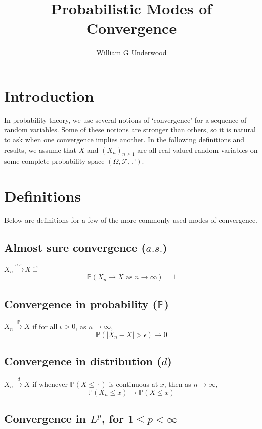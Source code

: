 \documentclass{article}
\title{Probabilistic Modes of Convergence}
\author{William G Underwood}
\begin{document}
\maketitle

\section{Introduction}

In probability theory, we use several notions of `convergence' for
a sequence of random variables.
Some of these notions are stronger than others, so it is natural to ask
when one convergence implies another.
In the following definitions and results, we assume that $X$ and $(X_n)_{n \geq 1}$ are all
real-valued random variables on some complete probability space
$(\Omega, \mathcal{F}, \mathbb{P})$.


\section{Definitions}

Below are definitions for a few of the more
commonly-used modes of convergence.

\subsection*{Almost sure convergence ($a.s.$)}

$X_n \xrightarrow{a.s.} X$
if
$$\mathbb{P}(X_n \to X \text{ as } n \to \infty) = 1$$

\subsection*{Convergence in probability ($\mathbb{P}$)}

$X_n \xrightarrow{\mathbb{P}} X$
if for all $\epsilon > 0$,
as $n \to \infty$,
$$\mathbb{P}(|X_n - X| > \epsilon) \to 0$$

\subsection*{Convergence in distribution ($d$)}

$X_n \xrightarrow{d} X$
if whenever $\mathbb{P}(X \leq \,\boldsymbol{\cdot}\,)$ is continuous at $x$,
then as $n \to \infty$,
$$\mathbb{P}(X_n \leq x) \to \mathbb{P}(X \leq x)$$

\subsection*{Convergence in $L^p$, for $1 \leq p < \infty$}
\end{document}
